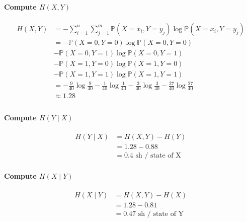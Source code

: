 \documentclass{article}
\newcommand{\1}{\mathbf{1}}
\renewcommand{\P}{\mathbb{P}}
\begin{document}
\paragraph{Compute $H(X, Y)$}
\begin{align*}
  H(X, Y)
   & = - \sum_{i=1}^n \sum_{j=1}^m \P(X = x_i, Y = y_j) \log \P(X = x_i, Y = y_j)                                                            \\
   & = - \P(X = 0, Y = 0) \log \P(X = 0, Y = 0)                                                                                              \\
   & - \P(X = 0, Y = 1) \log \P(X = 0, Y = 1)                                                                                                \\
   & - \P(X = 1, Y = 0) \log \P(X = 1, Y = 0)                                                                                                \\
   & - \P(X = 1, Y = 1) \log \P(X = 1, Y = 1)                                                                                                \\
   & = - \frac{9}{40} \log \frac{9}{40} - \frac{1}{40} \log \frac{1}{40} - \frac{3}{40} \log \frac{3}{40} - \frac{27}{40} \log \frac{27}{40} \\
   & \approx 1.28                                                                                                                            \\
\end{align*}

\paragraph{Compute $H(Y \mid X)$}
\begin{align*}
  H(Y \mid X)
   & = H(X, Y) - H(Y)              \\
   & = 1.28 - 0.88                 \\
   & = 0.4 \text{ sh / state of X}
\end{align*}

\paragraph{Compute $H(X \mid Y)$}
\begin{align*}
  H(X \mid Y)
   & = H(X, Y) - H(X)               \\
   & = 1.28 - 0.81                  \\
   & = 0.47 \text{ sh / state of Y}
\end{align*}
\end{document}

